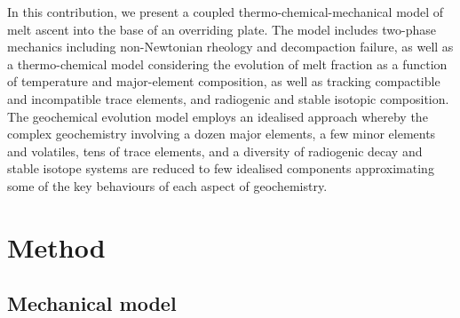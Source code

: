 \documentclass[12pt,a4paper]{article}
\begin{document}
In this contribution, we present a coupled thermo-chemical-mechanical model of melt ascent into the base of an overriding plate. The model includes two-phase mechanics including non-Newtonian rheology and decompaction failure, as well as a thermo-chemical model considering the evolution of melt fraction as a function of temperature and major-element composition, as well as tracking compactible and incompatible trace elements, and radiogenic and stable isotopic composition. The geochemical evolution model employs an idealised approach whereby the complex geochemistry involving a dozen major elements, a few minor elements and volatiles, tens of trace elements, and a diversity of radiogenic decay and stable isotope systems are reduced to few idealised components approximating some of the key behaviours of each aspect of geochemistry.




\section{Method}

\subsection{Mechanical model}
\end{document}
